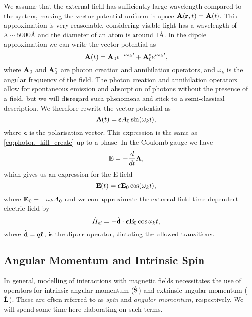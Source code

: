     We assume that the external field has sufficiently large wavelength compared to the 
    system, making the vector potential uniform in space $\vb{A}(\vb{r}, t) = \vb{A}(t)$.
    This approximation is very reasonable, considering visible light has a wavelength of 
    $\lambda \sim 5000 \text{Å}$ and the diameter of an atom is around $1 \text{Å}$. In the dipole 
    approximation we can write the vector potential as 
    \begin{equation}
        \label{eq:photon_kill_create}
        \vb{A}(t) = \vb{A}_0e^{-i \omega_k t} + \vb{A}_0^*e^{i\omega_k t},
    \end{equation}
    where $\vb{A}_0$ and $\vb{A}_0^*$ are photon creation and annihilation operators,
    and $\omega_k$ is the angular frequency of the field.
    The photon creation and annihilation operators allow for spontaneous emission and absorption of photons without the presence 
    of a field, but we will disregard such phenomena and stick to a semi-classical 
    description. We therefore rewrite the vector potential as 
    \begin{equation}
        \vb{A}(t) = \boldsymbol{\epsilon} A_0\sin(\omega_k t),
    \end{equation}
    where $\boldsymbol{\epsilon}$ is the polarisation vector.
    This expression is the same as \autoref{eq:photon_kill_create} up to a phase. In the Coulomb gauge we have 
    \begin{equation}
        \vb{E} = - \frac{d}{dt}\vb{A},
    \end{equation}
    which gives us an expression for the E-field 
    \begin{equation}
        \vb{E}(t) = \boldsymbol{\epsilon} \vb{E}_0 \cos(\omega_k t),
    \end{equation}
    where $\vb{E}_0 = -\omega_k A_0$ and we can approximate the external
    field time-dependent electric field by 
    \begin{equation}
        \hat{H}_\text{ef} = - \hat{\vb{d}} \cdot \boldsymbol{\epsilon} \vb{E}_0 \cos{\omega_k t},
    \end{equation}
    where $\hat{\vb{d}} = q\hat{\vb{r}}$, is the dipole operator, dictating the 
    allowed transitions.

    \subsection{Angular Momentum and Intrinsic Spin}

    In general, modelling of interactions with magnetic fields necessitates the 
    use of operators for intrinsic angular momentum ($\hat{\vb{S}}$) and extrinsic 
    angular momentum ($\hat{\vb{L}}$). These are often referred to as \emph{spin} 
    and \emph{angular momentum}, respectively.
    We will spend some time here elaborating on such terms.

